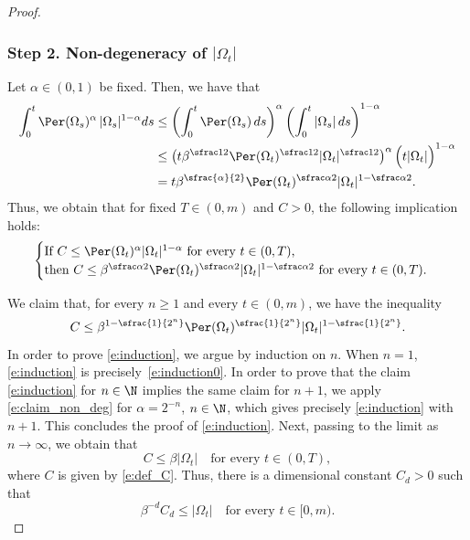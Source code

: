 \begin{proof}
\subsubsection*{Step 2. Non-degeneracy of $|\Omega_t|$}
Let $\alpha\in(0,1)$ be fixed. Then, we have that
\begin{align*}
\int_0^t \Per(\Omega_s)^\alpha\,|\Omega_s|^{1-\alpha} ds&\le \left(\int_0^t \Per(\Omega_s)\,ds\right)^{\alpha}\left(\int_0^t|\Omega_s|\,ds\right)^{1-\alpha}\\
&\le \left(t\beta^{\sfrac12} \Per(\Omega_t)^{\sfrac12}|\Omega_t|^{\sfrac12}\right)^{\alpha}\Big(t|\Omega_t|\Big)^{1-\alpha}\\
&=t\beta^{\sfrac{\alpha}{2}} \Per(\Omega_t)^{\sfrac\alpha2}|\Omega_t|^{1-\sfrac\alpha2}.
\end{align*}
Thus, we obtain that for fixed $T\in(0,m)$ and $C>0$, the following implication holds:%
\begin{equation}\label{e:claim_non_deg}
\begin{cases}
\text{If $C\le \Per(\Omega_t)^\alpha|\Omega_t|^{1-\alpha}$ for every $t\in(0,T)$,}\\
\text{then $C\le \beta^{\sfrac\alpha2} \Per(\Omega_t)^{\sfrac\alpha2}|\Omega_t|^{1-\sfrac\alpha2}$ for every $t\in(0,T)$.}
\end{cases}
\end{equation}

We claim that, for every $n\ge 1$ and every $t\in(0,m)$, we have the inequality
\begin{equation}\label{e:induction}
C\le \beta^{1-\sfrac{1}{2^{n}}}\Per(\Omega_t)^{\sfrac{1}{2^{n}}}|\Omega_t|^{1-\sfrac{1}{2^{n}}}.
\end{equation}
In order to prove \eqref{e:induction}, we argue by induction on $n$. When $n=1$, \eqref{e:induction} is precisely~\eqref{e:induction0}. In order to prove that the claim \eqref{e:induction} for $n\in \N$ implies the same claim for $n+1$, we apply \eqref{e:claim_non_deg} for $\alpha=2^{-n}$, $n\in\N$, which gives precisely \eqref{e:induction} with $n+1$. This concludes the proof of \eqref{e:induction}. Next, passing to the limit as $n\to\infty$, we obtain that
\[C\le \beta |\Omega_t|\quad\text{for every } t\in(0,T),\]
where $C$ is given by \eqref{e:def_C}. Thus, there is a dimensional constant $C_d>0$ such that
\begin{equation}\label{e:measure_non_degeneracy}
\beta^{-d} C_d\le |\Omega_t|\quad\text{for every } t\in[0,m).
\end{equation}


\end{proof}
